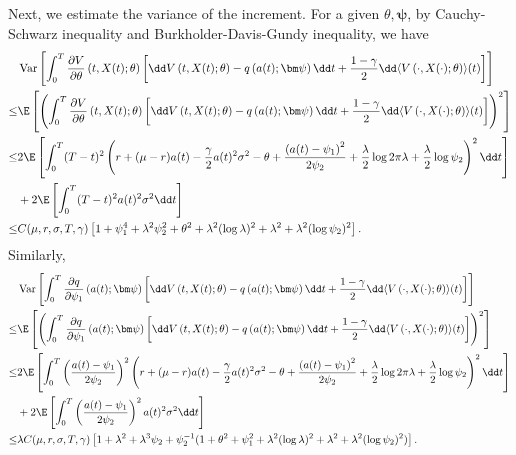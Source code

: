Next, we estimate the variance of the increment. For a given $\theta,\bm\psi$, by Cauchy-Schwarz inequality and Burkholder-Davis-Gundy inequality, we have
\[ \begin{aligned}
& \operatorname{Var}\left[  \int_0^T \frac{\partial V}{\partial \theta}\left(t, X(t);\theta \right) \left[ \dd V\left(t , X(t);\theta  \right) - q\left( a(t) ;\bm\psi\right)\dd t + \frac{1-\gamma}{2}\dd \langle V\left( \cdot,X(\cdot);\theta \right)\rangle(t)  \right]  \right] \\
\leq & \E\left[ \left(  \int_0^T \frac{\partial V}{\partial \theta}\left(t, X(t);\theta \right) \left[ \dd V\left(t , X(t);\theta  \right) - q\left( a(t) ;\bm\psi\right)\dd t + \frac{1-\gamma}{2}\dd \langle V\left( \cdot,X(\cdot);\theta \right)\rangle(t)  \right] \right)^2 \right] \\
\leq & 2\E\left[ \int_0^T (T-t)^2   \left( r + (\mu - r)a(t) - \frac{\gamma}{2}a(t)^2\sigma^2  -\theta +  \frac{\left( a(t) - \psi_{1} \right)^2}{2\psi_{2}} + \frac{\lambda}{2}\log2\pi\lambda + \frac{\lambda}{2}\log\psi_{2} \right)^2\dd t \right] \\
& + 2\E\left[ \int_0^T (T-t)^2 a(t)^2\sigma^2 \dd t \right] \\
\leq & C(\mu,r,\sigma,T,\gamma) \left[1+ \psi_1^4 + \lambda^2 \psi_2^2 + \theta^2 + \lambda^2(\log\lambda)^2 + \lambda^2 + \lambda^2(\log\psi_2)^2 \right].
\end{aligned} \]
Similarly,
\[ \begin{aligned}
& \operatorname{Var}\left[  \int_0^T \frac{\partial q}{\partial \psi_1}\left( a(t);\bm\psi \right) \left[ \dd V\left(t , X(t);\theta  \right) - q\left( a(t) ;\bm\psi\right)\dd t + \frac{1-\gamma}{2}\dd \langle V\left( \cdot,X(\cdot);\theta \right)\rangle(t)  \right]   \right] \\
\leq & \E\left[ \left( \int_0^T \frac{\partial q}{\partial \psi_1}\left( a(t);\bm\psi \right) \left[ \dd V\left(t , X(t);\theta  \right) - q\left( a(t) ;\bm\psi\right)\dd t + \frac{1-\gamma}{2}\dd \langle V\left( \cdot,X(\cdot);\theta \right)\rangle(t)  \right] \right)^2  \right] \\
\leq & 2\E\left[ \int_0^T \left(\frac{a(t) - \psi_1}{2\psi_2} \right)^2  \left( r + (\mu - r)a(t) - \frac{\gamma}{2}a(t)^2\sigma^2  -\theta +  \frac{\left( a(t) - \psi_{1} \right)^2}{2\psi_{2}} + \frac{\lambda}{2}\log2\pi\lambda + \frac{\lambda}{2}\log\psi_{2} \right)^2 \dd t \right] \\
& + 2\E\left[ \int_0^T \left(\frac{a(t) - \psi_1}{2\psi_2} \right)^2 a(t)^2\sigma^2\dd t  \right] \\
\leq & \lambda C(\mu,r,\sigma,T,\gamma)\left[1 + \lambda^2 + \lambda^3\psi_2 + \psi_2^{-1}(1 + \theta^2 + \psi_1^2 + \lambda^2(\log\lambda)^2 + \lambda^2 + \lambda^2 (\log\psi_2)^2)  \right] .
\end{aligned} \]
